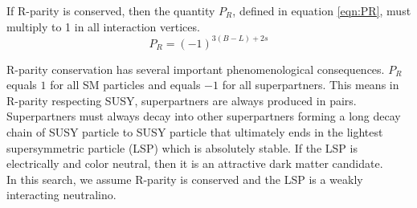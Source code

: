 \indent If R-parity is conserved, then the quantity $P_R$, defined in equation \ref{eqn:PR}, must multiply to 1 in all interaction vertices.  \\

\begin{equation}
\label{eqn:PR}
P_R = (-1)^{3(B-L)+2s}
\end{equation}

\indent R-parity conservation has several important phenomenological consequences.  $P_R$ equals $1$ for all SM particles and equals $-1$ for all superpartners. This means in R-parity respecting SUSY, superpartners are always produced in pairs.  Superpartners must always decay into other superpartners forming a long decay chain of SUSY particle to SUSY particle that ultimately ends in the lightest supersymmetric particle (LSP) which is absolutely stable.  If the LSP is electrically and color neutral, then it is an attractive dark matter candidate.  \\

\indent In this search, we assume R-parity is conserved and the LSP is a weakly interacting neutralino.  \\
